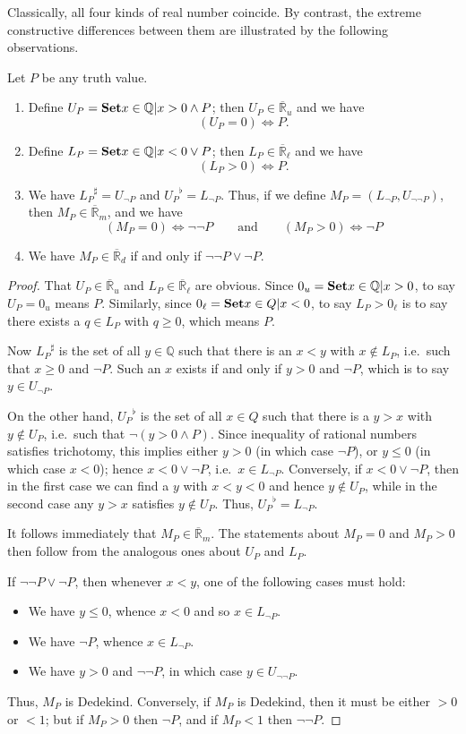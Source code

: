 \documentclass{article}
\def\Q{\mathbb{Q}}
\def\R{\mathbb{R}}
\def\Re{\overline{\R}}
\def\Red{\Re_d}
\def\Rem{\Re_m}
\def\Reu{\Re_u}
\def\Rel{\Re_{\ell}}
\def\upp#1{{#1}^{\sharp}}
\def\low#1{{#1}^{\flat}}
\begin{document}
Classically, all four kinds of real number coincide.
By contrast, the extreme constructive differences between them are illustrated by the following observations.

\begin{thm}
  Let $P$ be any truth value.
  \begin{enumerate}
  \item Define $U_P = \setof{x\in \Q | x>0 \land P}$; then $U_P \in \Reu$ and we have
    \[ (U_P = 0) \iff P. \]
  \item Define $L_P = \setof{x\in \Q | x<0 \lor P}$; then $L_P\in \Rel$ and we have
    \[ (L_P > 0) \iff P. \]
  \item We have $\upp{L_P} = U_{\neg P}$ and $\low{U_P} = L_{\neg P}$.
    Thus, if we define $M_P = (L_{\neg P},U_{\neg\neg P})$, then $M_P \in \Rem$, and we have
    \[ (M_P = 0) \iff \neg\neg P \qquad\text{and}\qquad (M_P > 0) \iff \neg P \]
  \item We have $M_P\in\Red$ if and only if $\neg\neg P\lor\neg P$.
  \end{enumerate}
\end{thm}
\begin{proof}
  That $U_P \in \Reu$ and $L_P\in \Rel$ are obvious.
  Since $0_u = \setof{ x\in\Q | x>0 }$, to say $U_P = 0_u$ means $P$.
  Similarly, since $0_\ell = \setof{x\in Q | x<0}$, to say $L_P > 0_\ell$ is to say there exists a $q\in L_P$ with $q\ge 0$, which means $P$.

  Now $\upp{L_P}$ is the set of all $y\in \Q$ such that there is an $x<y$ with $x\notin L_P$, i.e.\ such that $x\ge 0$ and $\neg P$.
  Such an $x$ exists if and only if $y>0$ and $\neg P$, which is to say $y\in U_{\neg P}$.

  On the other hand, $\low{U_P}$ is the set of all $x\in Q$ such that there is a $y>x$ with $y\notin U_P$, i.e.\ such that $\neg (y>0 \land P)$.
  Since inequality of rational numbers satisfies trichotomy, this implies either $y>0$ (in which case $\neg P$), or $y\le 0$ (in which case $x<0$); hence $x<0 \lor \neg P$, i.e.\ $x\in L_{\neg P}$.
  Conversely, if $x<0 \lor \neg P$, then in the first case we can find a $y$ with $x<y<0$ and hence $y\notin U_P$, while in the second case any $y>x$ satisfies $y\notin U_P$.
  Thus, $\low{U_P} = L_{\neg P}$.

  It follows immediately that $M_P \in \Rem$.
  The statements about $M_P=0$ and $M_P>0$ then follow from the analogous ones about $U_P$ and $L_P$.

  If $\neg\neg P\lor \neg P$, then whenever $x<y$, one of the following cases must hold:
  \begin{itemize}
  \item We have $y\le 0$, whence $x<0$ and so $x\in L_{\neg P}$.
  \item We have $\neg P$, whence $x\in L_{\neg P}$.
  \item We have $y>0$ and $\neg\neg P$, in which case $y\in U_{\neg\neg P}$.
  \end{itemize}
  Thus, $M_P$ is Dedekind.
  Conversely, if $M_P$ is Dedekind, then it must be either $>0$ or $<1$; but if $M_P>0$ then $\neg P$, and if $M_P<1$ then $\neg\neg P$.
\end{proof}
\end{document}

